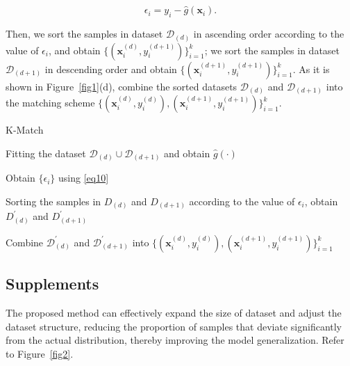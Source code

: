 \documentclass[sn-mathphys,Numbered]{sn-jnl}%
\theoremstyle{thmstyleone}%
\theoremstyle{thmstyletwo}%
\theoremstyle{thmstylethree}%
\begin{document}
\begin{equation}
\epsilon_i=y_i-\hat{g}(\boldsymbol{x}_i).\label{eq12}
\end{equation}

Then, we sort the samples in dataset $\mathcal{D}_{(d)}$ in ascending order according to the value of $\epsilon_i$, and obtain $\{(\boldsymbol{x}_i^{(d)},y_i^{(d+1)})\}_{i=1}^k$; we sort the samples in dataset $\mathcal{D}_{(d+1)}$ in descending order and obtain $\{(\boldsymbol{x}_i^{(d+1)},y_i^{(d+1)})\}_{i=1}^k$. As it is shown in Figure~\ref{fig1}(d), combine the sorted datasets $\mathcal{D}_{(d)}$ and $\mathcal{D}_{(d+1)}$ into the matching scheme $\{(\boldsymbol{x}_i^{(d)},y_i^{(d)}),(\boldsymbol{x}_i^{(d+1)},y_i^{(d+1)})\}_{i=1}^k$.

\begin{algorithm}[H] 
	\caption{K-Match}
	\label{alg:algorithm3}
	\BlankLine
	Fitting the dataset $\mathcal{D}_{(d)}\cup\mathcal{D}_{(d+1)}$ and obtain $\hat{g}(\cdot)$

        Obtain $\{\epsilon_i\}$ using \eqref{eq10}

        Sorting the samples in $D_{(d)}$ and $D_{(d+1)}$ according to the value of $\epsilon_i$, obtain $D^\prime_{(d)}$ and $D_{(d+1)}^\prime$

        Combine $\mathcal{D}_{(d)}^\prime$ and $\mathcal{D}_{(d+1)}^\prime$ into $\{(\boldsymbol{x}_i^{(d)},y_i^{(d)}),(\boldsymbol{x}_i^{(d+1)},y_i^{(d+1)})\}_{i=1}^k$

\end{algorithm}

\subsection{Supplements}\label{subsec4}

The proposed method can effectively expand the size of dataset and adjust the dataset structure, reducing the proportion of samples that deviate significantly from the actual distribution, thereby improving the model generalization. Refer to Figure~\ref{fig2}.
\end{document}
